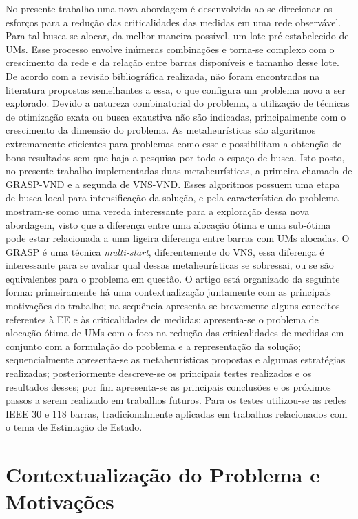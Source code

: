 \documentclass[12pt]{article}
\begin{document}
No presente trabalho uma nova abordagem é desenvolvida ao se direcionar os esforços para a redução das criticalidades das medidas em uma rede observável. Para tal busca-se alocar, da melhor maneira possível, um lote pré-estabelecido de UMs. Esse processo envolve inúmeras combinações e torna-se complexo com o crescimento da rede e da relação entre barras disponíveis e tamanho desse lote. De acordo com a revisão bibliográfica realizada, não foram encontradas na literatura propostas semelhantes a essa, o que configura um problema novo a ser explorado. Devido a natureza combinatorial do problema, a utilização de técnicas de otimização exata ou busca exaustiva não são indicadas, principalmente com o crescimento da dimensão do problema. As metaheurísticas são algoritmos extremamente eficientes para problemas como esse e possibilitam a obtenção de bons resultados sem que haja a pesquisa por todo o espaço de busca. Isto posto, no presente trabalho implementadas duas metaheurísticas, a primeira chamada de GRASP-VND e a segunda de VNS-VND. Esses algoritmos possuem uma etapa de busca-local para intensificação da solução, e pela característica do problema mostram-se como uma vereda interessante para a exploração dessa nova abordagem, visto que a diferença entre uma alocação ótima e uma sub-ótima pode estar relacionada a uma ligeira diferença entre barras com UMs alocadas. O GRASP é uma técnica \textit{multi-start}, diferentemente do VNS, essa diferença é interessante para se avaliar qual dessas metaheurísticas se sobressai, ou se são equivalentes para o problema em questão. O artigo está organizado da seguinte forma: primeiramente há uma contextualização juntamente com as principais motivações do trabalho; na sequência apresenta-se brevemente alguns conceitos referentes à EE e às criticalidades de medidas; apresenta-se o problema de alocação ótima de UMs com o foco na redução das criticalidades de medidas em conjunto com a formulação do  problema e a representação da solução; sequencialmente apresenta-se as metaheurísticas propostas e algumas estratégias realizadas; posteriormente descreve-se os principais testes realizados e os resultados desses; por fim apresenta-se as principais conclusões e os próximos passos a serem realizado em trabalhos futuros. Para os testes utilizou-se as redes IEEE 30 e 118 barras, tradicionalmente aplicadas em trabalhos relacionados com o tema de Estimação de Estado.

\section{Contextualização do Problema e Motivações}
\end{document}
